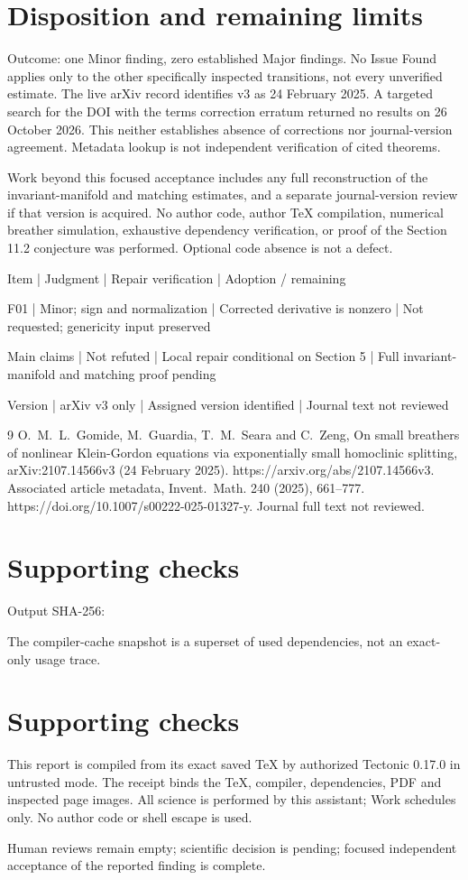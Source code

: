 \documentclass[10pt]{article}
\begin{document}
\section*{Disposition and remaining limits}
Outcome: one Minor finding, zero established Major findings. No Issue Found applies only to the other specifically inspected transitions, not every unverified estimate. The live arXiv record identifies v3 as 24 February 2025. A targeted search for the DOI with the terms correction erratum returned no results on 26 October 2026. This neither establishes absence of corrections nor journal-version agreement. Metadata lookup is not independent verification of cited theorems.\par
Work beyond this focused acceptance includes any full reconstruction of the invariant-manifold and matching estimates, and a separate journal-version review if that version is acquired. No author code, author TeX compilation, numerical breather simulation, exhaustive dependency verification, or proof of the Section 11.2 conjecture was performed. Optional code absence is not a defect.\par
Item | Judgment | Repair verification | Adoption / remaining\par
F01 | Minor; sign and normalization | Corrected derivative is nonzero | Not requested; genericity input preserved\par
Main claims | Not refuted | Local repair conditional on Section 5 | Full invariant-manifold and matching proof pending\par
Version | arXiv v3 only | Assigned version identified | Journal text not reviewed\par
9 O. M. L. Gomide, M. Guardia, T. M. Seara and C. Zeng, On small breathers of nonlinear Klein-Gordon equations via exponentially small homoclinic splitting, arXiv:2107.14566v3 (24 February 2025). https://arxiv.org/abs/2107.14566v3. Associated article metadata, Invent. Math. 240 (2025), 661–777. https://doi.org/10.1007/s00222-025-01327-y. Journal full text not reviewed.\par
\section*{Supporting checks}
Output SHA-256:\par
The compiler-cache snapshot is a superset of used dependencies, not an exact-only usage trace.\par
\section*{Supporting checks}
This report is compiled from its exact saved TeX by authorized Tectonic 0.17.0 in untrusted mode. The receipt binds the TeX, compiler, dependencies, PDF and inspected page images. All science is performed by this assistant; Work schedules only. No author code or shell escape is used.\par
Human reviews remain empty; scientific decision is pending; focused independent acceptance of the reported finding is complete.\par
\end{document}
